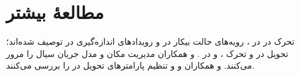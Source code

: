 \documentclass[11pt,a4paper]{article}
\begin{document}
\section{مطالعهٔ بیشتر}
تحرک در  در \cite{ts36300}، رویه‌های حالت بیکار در \cite{ts36304} و رویدادهای اندازه‌گیری در
\cite{ts36331} توصیف شده‌اند؛ تحویل  در \cite{ts23009} و تحرک ،  و
 در \cite{ts38300}.  و همکاران \cite{akyildiz1999mobility} مدیریت مکان و مدل جریان
سیال را مرور می‌کنند.  و همکاران \cite{sesia2011lte} و  و 
\cite{holma2011lte} تنظیم پارامترهای تحویل در  را بررسی می‌کنند.

\begin{latin}
\printbibliography[heading=subbibliography,title={References}]
\end{latin}
\end{document}
